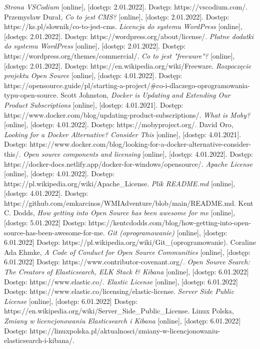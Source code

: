 \documentclass{article}
\begin{document}
\begin{thebibliography}{99}
    \emph{Strona VSCodium} [online], [dostęp: 2.01.2022].
    Dostęp: https://vscodium.com/.
    Przemysław Durał, \emph{Co to jest CMS?} [online], [dostęp: 2.01.2022].
    Dostęp: https://ks.pl/slownik/co-to-jest-cms.    
    \emph{Licencja do systemu WordPress} [online], [dostęp: 2.01.2022].
    Dostęp: https://wordpress.org/about/license/.      
    \emph{Płatne dodatki do systemu WordPress} [online], [dostęp: 2.01.2022].
    Dostęp: https://wordpress.org/themes/commercial/.      
    \emph{Co to jest "freeware"?} [online], [dostęp: 2.01.2022].
    Dostęp: https://en.wikipedia.org/wiki/Freeware.    
    \emph{Rozpoczęcie projektu Open Source} [online], [dostęp: 4.01.2022].
    Dostęp: https://opensource.guide/pl/starting-a-project/\#co-i-dlaczego-oprogramowania-typu-open-source.
    Scott Johnston, \emph{Docker is Updating and Extending Our Product Subscriptions} [online], [dostęp: 4.01.2021].
    Dostęp: https://www.docker.com/blog/updating-product-subscriptions/.    
    \emph{What is Moby?} [online], [dostęp: 4.01.2022].
    Dostęp: https://mobyproject.org/.      
    David Oro, \emph{Looking for a Docker Alternative? Consider This} [online], [dostęp: 4.01.2021].
    Dostęp: https://www.docker.com/blog/looking-for-a-docker-alternative-consider-this/. 
    \emph{Open source components and licensing} [online], [dostęp: 4.01.2022].
    Dostęp: https://docker-docs.netlify.app/docker-for-windows/opensource/. 
    \emph{Apache License} [online], [dostęp: 4.01.2022].
    Dostęp: https://pl.wikipedia.org/wiki/Apache\_License. 
    \emph{Plik README.md} [online], [dostęp: 4.01.2022].
    Dostęp: https://github.com/emkarcinos/WMIAdventure/blob/main/README.md. 
    Kent C. Dodds, \emph{How getting into Open Source has been awesome for me} [online], [dostęp: 5.01.2022]
    Dostęp: https://kentcdodds.com/blog/how-getting-into-open-source-has-been-awesome-for-me.
    \emph{Git (oprogramowanie)} [online], [dostęp: 6.01.2022]
    Dostęp: https://pl.wikipedia.org/wiki/Git\_(oprogramowanie).
    Coraline Ada Ehmke, \emph{A Code of Conduct for Open Source Communities} [online], [dostęp: 6.01.2022]
    Dostęp: https://www.contributor-covenant.org/.
    \emph{Open Source Search: The Creators of Elasticsearch, ELK Stack \& Kibana} [online], [dostęp: 6.01.2022]
    Dostęp: https://www.elastic.co/.
    \emph{Elastic License} [online], [dostęp: 6.01.2022]
    Dostęp: https://www.elastic.co/licensing/elastic-license.
    \emph{Server Side Public License} [online], [dostęp: 6.01.2022]
    Dostęp: https://en.wikipedia.org/wiki/Server\_Side\_Public\_License.
    Linux Polska, \emph{Zmiany w licencjonowaniu Elasticsearch i Kibana} [online], [dostęp: 6.01.2022]
    Dostęp: https://linuxpolska.pl/aktualnosci/zmiany-w-licencjonowaniu-elasticsearch-i-kibana/.    
    
    
\end{thebibliography}
\end{document}
